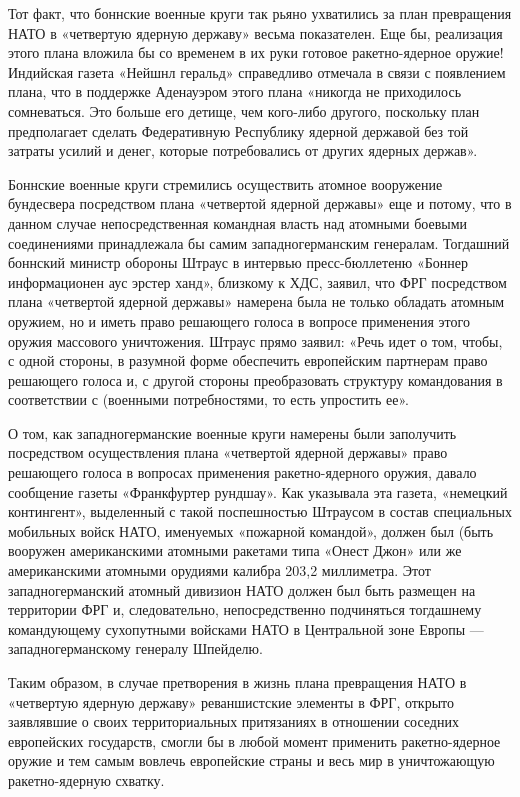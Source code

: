\documentclass[12pt, a4paper, openany]{book}
\begin{document}
	
	
	Тот факт, что боннские военные круги так рьяно ухватились за план превращения НАТО в «четвертую ядерную державу» весьма показателен. Еще бы, реализация этого плана вложила бы со временем в их руки готовое ракетно-ядерное оружие! Индийская газета «Нейшнл геральд» справедливо отмечала в связи с появлением плана, что в поддержке Аденауэром этого плана «никогда не приходилось сомневаться. Это больше его детище, чем кого-либо другого, поскольку план предполагает сделать Федеративную Республику ядерной державой без той затраты усилий и денег, которые потребовались от других ядерных держав».
	
	Боннские военные круги стремились осуществить атомное вооружение бундесвера посредством плана «четвертой ядерной державы» еще и потому, что в данном случае непосредственная командная власть над атомными боевыми соединениями принадлежала бы самим западногерманским генералам. Тогдашний боннский министр обороны Штраус в интервью пресс-бюллетеню «Боннер информационен аус эрстер ханд», близкому к ХДС, заявил, что ФРГ посредством плана «четвертой ядерной державы» намерена была не только обладать атомным оружием, но и иметь право решающего голоса в вопросе применения этого оружия массового уничтожения. Штраус прямо заявил: «Речь идет о том, чтобы, с одной стороны, в разумной форме обеспечить европейским партнерам право решающего голоса и, с другой стороны преобразовать структуру командования в соответствии с (военными потребностями, то есть упростить ее».
	
	О том, как западногерманские военные круги намерены были заполучить посредством осуществления плана «четвертой ядерной державы» право решающего голоса в вопросах применения ракетно-ядерного оружия, давало сообщение газеты «Франкфуртер рундшау». Как указывала эта газета, «немецкий контингент», выделенный с такой поспешностью Штраусом в состав специальных мобильных войск НАТО, именуемых «пожарной командой», должен был (быть вооружен американскими атомными ракетами типа «Онест Джон» или же американскими атомными орудиями калибра 203,2 миллиметра. Этот западногерманский атомный дивизион НАТО должен был быть размещен на территории ФРГ и, следовательно, непосредственно подчиняться тогдашнему командующему сухопутными войсками НАТО в Центральной зоне Европы — западногерманскому генералу Шпейделю.
	
	Таким образом, в случае претворения в жизнь плана превращения НАТО в «четвертую ядерную державу» реваншистские элементы в ФРГ, открыто заявлявшие о своих территориальных притязаниях в отношении соседних европейских государств, смогли бы в любой момент применить ракетно-ядерное оружие и тем самым вовлечь европейские страны и весь мир в уничтожающую ракетно-ядерную схватку.
	
\end{document}
